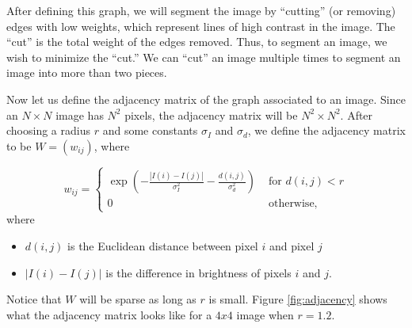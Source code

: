 After defining this graph, we will segment the image by ``cutting'' (or removing) edges with low weights, which represent lines of high contrast in the image. 
The ``cut'' is the total weight of the edges removed. Thus, to segment an image, we wish to minimize the ``cut.''
We can ``cut'' an image multiple times to segment an image into more than two pieces.

Now let us define the adjacency matrix of the graph associated to an image. 
Since an $N \times N$ image has $N^2$ pixels, the adjacency matrix will be $N^2 \times N^2$.
After choosing a radius $r$ and some constants $\sigma_I$ and $\sigma_d$, we define the adjacency matrix to be $W = (w_{ij})$, where

\begin{equation}
\label{eq:adjacency}
w_{ij} = \begin{cases} \exp(-\frac{|I(i) - I(j)|}{\sigma_I^2}-\frac{d(i,j)}{\sigma_d^2}) & \mbox{ for $d(i,j) < r$} \\ 0 & \mbox{ otherwise,} \end{cases}
\end{equation}
where
\begin{itemize}
	\item$d(i,j)$ is the Euclidean distance between pixel $i$ and pixel $j$
	\item $|I(i) - I(j)|$ is the difference in brightness of pixels $i$ and $j$.
\end{itemize}

Notice that $W$ will be sparse as long as $r$ is small. Figure \ref{fig:adjacency} shows what the adjacency matrix looks like for a $4x4$ image when $r=1.2$.

